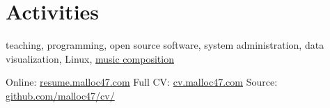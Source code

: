 \documentclass[10pt]{article}
\begin{document}



\section{Activities}
teaching, programming, open source software, system administration,
data visualization, Linux,
\href{https://soundcloud.com/malloc47}{music composition}

\null\vfill
\footnotesize{
  Online:  \href{http://resume.malloc47.com}{resume.malloc47.com} \hfill
  Full CV: \href{http://cv.malloc47.com}{cv.malloc47.com} \hfill
  Source:  \href{https://github.com/malloc47/cv}{github.com/malloc47/cv/}
}

\pagestyle{myheadings}

\end{document}
